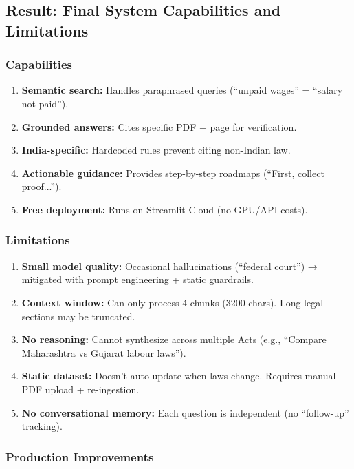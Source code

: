 \documentclass[11pt,a4paper]{article}
\begin{document}
\subsection{Result: Final System Capabilities and Limitations}

\subsubsection{Capabilities}

\begin{enumerate}
\item \textbf{Semantic search:} Handles paraphrased queries (``unpaid wages'' = ``salary not paid'').
\item \textbf{Grounded answers:} Cites specific PDF + page for verification.
\item \textbf{India-specific:} Hardcoded rules prevent citing non-Indian law.
\item \textbf{Actionable guidance:} Provides step-by-step roadmaps (``First, collect proof...'').
\item \textbf{Free deployment:} Runs on Streamlit Cloud (no GPU/API costs).
\end{enumerate}

\subsubsection{Limitations}

\begin{enumerate}
\item \textbf{Small model quality:} Occasional hallucinations (``federal court'') → mitigated with prompt engineering + static guardrails.
\item \textbf{Context window:} Can only process 4 chunks (3200 chars). Long legal sections may be truncated.
\item \textbf{No reasoning:} Cannot synthesize across multiple Acts (e.g., ``Compare Maharashtra vs Gujarat labour laws'').
\item \textbf{Static dataset:} Doesn't auto-update when laws change. Requires manual PDF upload + re-ingestion.
\item \textbf{No conversational memory:} Each question is independent (no ``follow-up'' tracking).
\end{enumerate}

\subsubsection{Production Improvements}
\end{document}
